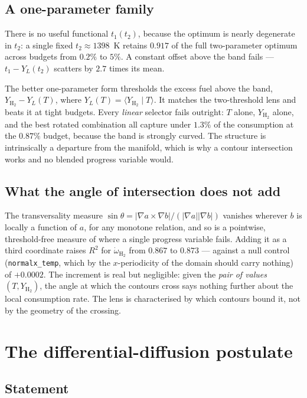 \documentclass[11pt]{article}
\newcommand{\YH}{Y_{\mathrm{H_2}}}
\newcommand{\grad}{\nabla}
\begin{document}
\subsection{A one-parameter family}

There is no useful functional $t_1(t_2)$, because the optimum is nearly
degenerate in $t_2$: a single fixed $t_2 \approx 1398$~K retains $0.917$ of
the full two-parameter optimum across budgets from $0.2\%$ to $5\%$. A
constant offset above the band fails --- $t_1 - Y_L(t_2)$ scatters by $2.7$
times its mean.

The better one-parameter form thresholds the excess fuel above the band,
$\YH - Y_L(T)$, where $Y_L(T) = \langle \YH \mid T\rangle$. It matches the
two-threshold lens and beats it at tight budgets. Every \emph{linear}
selector fails outright: $T$ alone, $\YH$ alone, and the best rotated
combination all capture under $1.3\%$ of the consumption at the $0.87\%$
budget, because the band is strongly curved. The structure is intrinsically a
departure from the manifold, which is why a contour intersection works and no
blended progress variable would.

\subsection{What the angle of intersection does not add}

The transversality measure
$\sin\theta = |\grad a \times \grad b| / (|\grad a||\grad b|)$ vanishes
wherever $b$ is locally a function of $a$, for any monotone relation, and so
is a pointwise, threshold-free measure of where a single progress variable
fails. Adding it as a third coordinate raises $R^2$ for
$\dot{\omega}_{\mathrm{H_2}}$ from $0.867$ to $0.873$ --- against a null
control (\texttt{normalx\_temp}, which by the $x$-periodicity of the domain
should carry nothing) of $+0.0002$. The increment is real but negligible:
given the \emph{pair of values} $(T,\YH)$, the angle at which the contours
cross says nothing further about the local consumption rate. The lens is
characterised by which contours bound it, not by the geometry of the crossing.

\section{The differential-diffusion postulate}
\label{sec:postulate}

\subsection{Statement}
\end{document}
